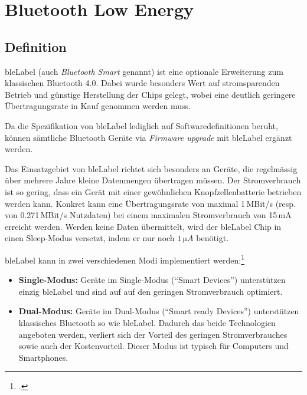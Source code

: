 \chapter{Bluetooth Low Energy}
\label{ch:ble}


\section{Definition}
\gls{bleLabel} (auch \textit{Bluetooth Smart} genannt) ist eine optionale Erweiterung zum klassischen Bluetooth 4.0.
Dabei wurde besonders Wert auf stromsparenden Betrieb und günstige Herstellung der Chips gelegt, wobei eine deutlich geringere Übertragungsrate in Kauf genommen werden muss.

Da die Spezifikation von \gls{bleLabel} lediglich auf Softwaredefinitionen beruht, können sämtliche Bluetooth Geräte via \textit{Firmware upgrade} mit \gls{bleLabel} ergänzt werden.

Das Einsatzgebiet von \gls{bleLabel} richtet sich besonders an Geräte, die regelmässig über mehrere Jahre kleine Datenmengen übertragen müssen. Der Stromverbrauch ist so gering, dass ein Gerät mit einer gewöhnlichen Knopfzellenbatterie betrieben werden kann. Konkret kann eine Übertragungsrate von maximal 1\,MBit/s (resp. von 0.271\,MBit/s Nutzdaten) bei einem maximalen Stromverbrauch von 15\,mA erreicht werden. Werden keine Daten übermittelt, wird der \gls{bleLabel} Chip in einen Sleep-Modus versetzt, indem er nur noch $1\,\si{\micro A}$ benötigt.

\gls{bleLabel} kann in zwei verschiedenen Modi implementiert werden:\footcite{Bluetooth_Low_Energy_vs_Classic_Bluetooth_Medical_Electronics_Design_2015-04-27}
\begin{itemize}
	\item \textbf{Single-Modus:} Geräte im Single-Modus ("`Smart Devices"') unterstützen einzig \gls{bleLabel} und sind auf auf den geringen Stromverbrauch optimiert.
	\item \textbf{Dual-Modus:} Geräte im Dual-Modus ("`Smart ready Devices"') unterstützen klassisches Bluetooth so wie \gls{bleLabel}. Dadurch das beide Technologien angeboten werden, verliert sich der Vorteil des geringen Stromverbrauches sowie auch der Kostenvorteil. Dieser Modus ist typisch für Computers und Smartphones.
\end{itemize}


